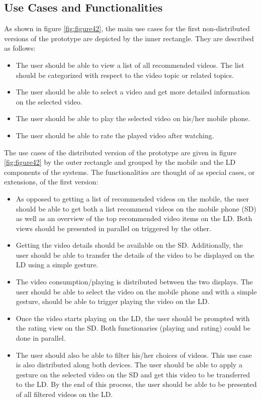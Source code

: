 \subsection{Use Cases and Functionalities}
As shown in figure \ref{fig:figure42}, the main use cases for the first non-distributed versions of the prototype are depicted by the inner rectangle. They are described as follows:
\begin{itemize}
  \item The user should be able to view a list of all recommended videos. The list should be categorized with respect to the video topic or related topics.
  \item The user should be able to select a video and get more detailed information on the selected video.
  \item The user should be able to play the selected video on his/her mobile phone.
  \item The user should be able to rate the played video after watching.
\end{itemize}
The use cases of the distributed version of the prototype are given in figure \ref{fig:figure42} by the outer rectangle and grouped by the mobile and the LD components of the systems. The functionalities are thought of as special cases, or extensions, of the first version:
\begin{itemize}
	\item As opposed to getting a list of recommended videos on the mobile, the user should be able to get both a list recommend videos on the mobile phone (SD) as well as an overview of the top recommended video items on the LD. Both views should be presented in parallel on triggered by the other. 
	\item Getting the video details should be available on the SD. Additionally, the user should be able to transfer the details of the video to be displayed on the LD using a simple gesture. 
	\item The video consumption/playing is distributed between the two displays. The user should be able to select the video on the mobile phone and with a simple gesture, should be able to trigger playing the video on the LD.
 \item Once the video starts playing on the LD, the user should be prompted with the rating view on the SD. Both functionaries (playing and rating) could be done in parallel.
 \item The user should also be able to filter his/her choices of videos. This use case is also distributed along both devices. The user should be able to apply a gesture on the selected video on the SD and get this video to be transferred to the LD. By the end of this process, the user should be able to be presented of all filtered videos on the LD. 
\end{itemize} 
     
